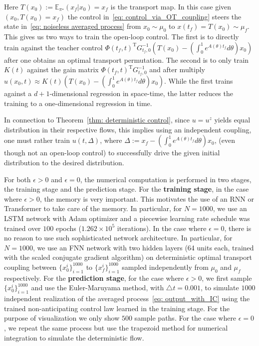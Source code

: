\documentclass[12pt]{amsart}
\renewcommand{\(}{\left (}
\renewcommand{\)}{\right )}
\numberwithin{equation}{section}
\begin{document}
Here $T(x_0):=\mathbb{E}_{\pi^{\star}}(x_f|x_0)=x_f$ is the transport map. In this case given $(x_0,T(x_0)=x_f)$ the control in~\eqref{eq: control_via_OT_coupling} steers the state in~\eqref{eq: noiseless averaged process} from $x_0\sim\mu_0$ to $x(t_f)=T(x_0)\sim\mu_f$. This gives us two ways to train the open-loop control. The first is to directly train against the teacher control $\Phi(t_f,t)^{\mathrm{T}} G_{t_f,0}^{-1}\left(T(x_0)-\left(\int_{0}^{1}e^{A(\theta)t_f}d\theta\right) x_0\right)$ after one obtains an optimal transport permutation. The second is to only train $K(t)$ against the gain matrix $\Phi(t_f,t)^{\mathrm{T}} G_{t_f,0}^{-1}$ and after multiply $u(x_0,t)\approx K(t)\left(T(x_0)-\left(\int_{0}^{1}e^{A(\theta)t_f}d\theta\right)x_0\right)$. While the first trains against a $d+1$-dimensional regression in space-time, the latter reduces the training to a one-dimensional regression in time.

In connection to Theorem~\ref{thm: deterministic control}, since $u=u^{z}$ yields equal distribution in their respective flows, this implies using an independent coupling, one must rather train $u(t,\Delta)$, where $\Delta := x_f-\left(\int_{0}^{1}e^{A(\theta)t_f}d\theta\right) x_0$, (even though not an open-loop control) to successfully drive the given initial distribution to the desired distribution. 

For both $\epsilon>0$ and $\epsilon=0$, the numerical computation is performed in two stages, the training stage and the prediction stage. For the \textbf{training stage}, in the case where $\epsilon>0$, the memory is very important. This motivates the use of an RNN or Transformer to take care of the memory.  In particular, for $N=1000$, we use an LSTM network with Adam optimizer and a piecewise learning rate schedule was trained over $100$ epochs ($1.262\times 10^5$ iterations). In the case where $\epsilon=0$, there is no reason to use such sophisticated network architecture.  In particular, for $N=1000$, we use an FNN network with two hidden layers (64 units each, trained with the scaled conjugate gradient algorithm) on deterministic optimal transport coupling between $\{x_0^i\}_{i=1}^{1000}$ to $\{x_f^i\}_{i=1}^{1000}$ sampled independently from $\mu_0$ and $\mu_f$ respectively. For the \textbf{prediction stage}, for the case where $\epsilon>0$, we first sample $\{x_0^i\}_{i=1}^{1000}$ and  use the Euler-Maruyama method, with $\triangle t=0.001$, to simulate $1000$ independent realization of the averaged process~\eqref{eq: output_with_IC} using the trained non-anticipating control law learned in the training stage. For the purpose of visualization we only show $500$ sample paths. For the case where $\epsilon=0$, we repeat the same process but use the trapezoid method for numerical integration to simulate the deterministic flow.
\end{document}
